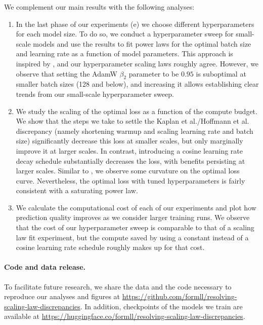 \documentclass{article}
\makeatletter
\theoremstyle{plain}
\theoremstyle{definition}
\theoremstyle{remark}
\newcommand{\Kaplan}{Kaplan et al.\@\xspace}
\newcommand{\Hoffmann}{Hoffmann et al.\@\xspace}
\makeatother
\begin{document}
%
We complement our main results with the following analyses: 
\begin{enumerate}[leftmargin=*]
    \item In the last phase of our experiments (e) we choose different hyperparameters for each model size. To do so, we conduct a hyperparameter sweep for small-scale models and use the results to fit power laws for the optimal batch size and learning rate as a function of model parameters. This approach is inspired by \citet{deepseekai2024deepseek}, and our hyperparameter scaling laws roughly agree. However, we observe that setting the AdamW $\beta_2$ parameter to be $0.95$ is suboptimal at smaller batch sizes (128 and below), and increasing it allows establishing clear trends from our small-scale hyperparameter sweep. 
    \item We study the scaling of the optimal loss as a function of the compute budget. We show that the steps we take to settle the \Kaplan/\Hoffmann discrepancy (namely shortening warmup and scaling learning rate and batch size) significantly decrease this loss at smaller scales, but only marginally improve it at larger scales. In contrast, introducing a cosine learning rate decay schedule substantially decreases the loss, with benefits persisting at larger scales. Similar to \citet{hoffmann2022empirical}, we observe some curvature on the optimal loss curve. Nevertheless, the optimal loss with tuned hyperparameters is fairly consistent with a saturating power law.
    \item We calculate the computational cost of each of our experiments and plot how prediction quality improves as we consider larger training runs. We observe that the cost of our hyperparameter sweep is comparable to that of a scaling law fit experiment, but the compute saved by using a constant instead of a cosine learning rate schedule roughly makes up for that cost.
\end{enumerate}

\paragraph{Code and data release.} To facilitate future research, we share the data and the code necessary to reproduce our analyses and figures at 
\url{https://github.com/formll/resolving-scaling-law-discrepancies}. In addition, checkpoints of the models we train are available at \url{https://huggingface.co/formll/resolving-scaling-law-discrepancies}. 
\end{document}

